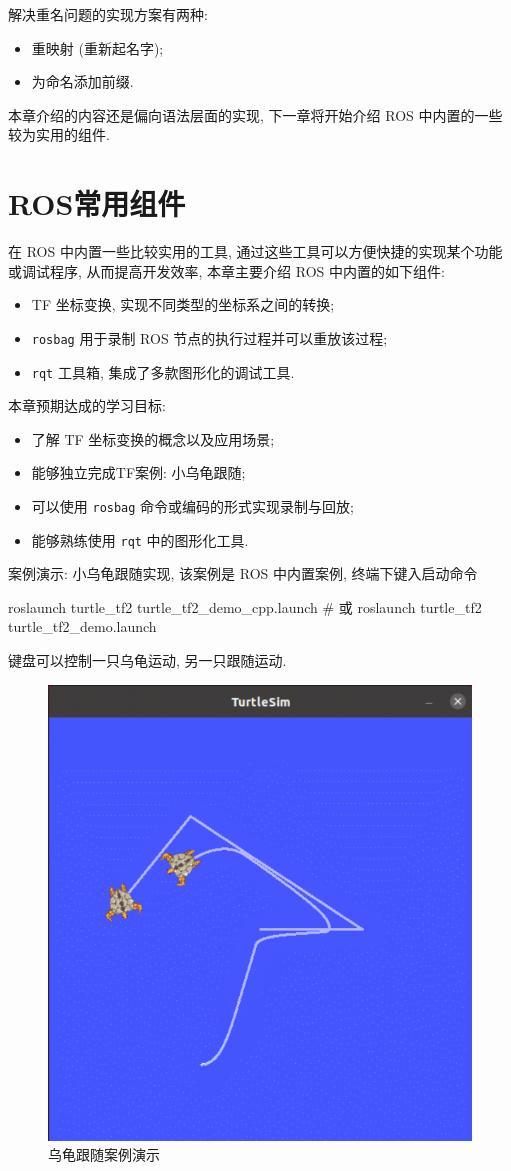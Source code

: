 \documentclass[openany, fontset=windowsold]{ctexbook}
\theoremstyle{kaiti}
\theoremstyle{normal}
\begin{document}
解决重名问题的实现方案有两种:

\begin{itemize}
  \item 重映射 (重新起名字);
  \item 为命名添加前缀.
\end{itemize}

本章介绍的内容还是偏向语法层面的实现, 下一章将开始介绍 ROS 中内置的一些较为实用的组件.

\chapter{ROS常用组件}
\label{chapter:ros_common_componenets}

在 ROS 中内置一些比较实用的工具, 通过这些工具可以方便快捷的实现某个功能或调试程序, 从而提高开发效率, 本章主要介绍 ROS 中内置的如下组件:

\begin{itemize}
  \item TF 坐标变换, 实现不同类型的坐标系之间的转换; 
  \item \verb|rosbag| 用于录制 ROS 节点的执行过程并可以重放该过程; 
  \item \verb|rqt| 工具箱, 集成了多款图形化的调试工具.
\end{itemize}

本章预期达成的学习目标:

\begin{itemize}
  \item 了解 TF 坐标变换的概念以及应用场景; 
  \item 能够独立完成TF案例: 小乌龟跟随; 
  \item 可以使用 \verb|rosbag| 命令或编码的形式实现录制与回放; 
  \item 能够熟练使用 \verb|rqt| 中的图形化工具.
\end{itemize}

案例演示: 小乌龟跟随实现, 该案例是 ROS 中内置案例, 终端下键入启动命令

\begin{bash}
  roslaunch turtle_tf2 turtle_tf2_demo_cpp.launch # 或
  roslaunch turtle_tf2 turtle_tf2_demo.launch
\end{bash}

键盘可以控制一只乌龟运动, 另一只跟随运动.

\begin{figure}[!ht]
  \centering
  \includegraphics[width=.5\textwidth]{ros_demo_turtle_following.png}
  \caption{乌龟跟随案例演示}
  \label{fig:ros_demo_turtle_following}
\end{figure}
\end{document}
